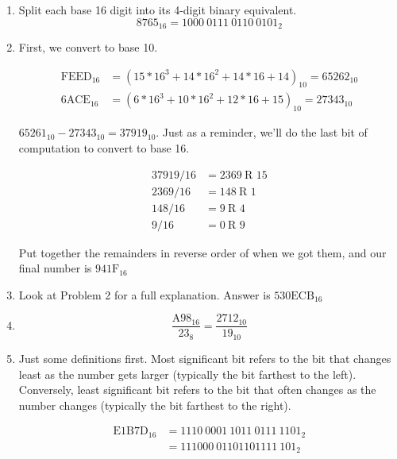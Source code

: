 \documentclass[12pt]{article}
\begin{document}
\begin{enumerate}

\item
Split each base 16 digit into its 4-digit binary equivalent.
\begin{equation*}
8765_{16} = \boxed{1000~0111~0110~0101_{2}}
\end{equation*}

\item
First, we convert to base 10.

\begin{align*}
\text{FEED}_{16} & = (15 * 16^3 + 14 * 16^2 + 14 * 16 + 14)_{10} = 65262_{10}\\
\text{6ACE}_{16} & = (6 * 16^3 + 10 * 16^2 + 12 * 16 + 15)_{10} = 27343_{10}
\end{align*}

$65261_{10} - 27343_{10} = 37919_{10}$.
Just as a reminder, we'll do the last bit of computation to convert to base 16. 

\begin{align*}
37919/16 &= 2369~\text{R 15}\\
2369/16 &= 148~\text{R 1}\\
148/16 &= 9~\text{R 4}\\
9/16 &= 0~\text{R 9}
\end{align*}

Put together the remainders in reverse order of when we got them, and our final number is $\boxed{\text{941F}_{16}}$

\item
Look at Problem 2 for a full explanation. Answer is $\boxed{\text{530ECB}_{16}}$

\item
\begin{equation*}
\frac{\text{A98}_{16}}{23_{8}} =  \boxed{\frac{\text{2712}_{10}}{19_{10}}}
\end{equation*}

\item
Just some definitions first. 
Most significant bit refers to the bit that changes least as the number gets larger 
(typically the bit farthest to the left). 
Conversely, least significant bit refers to the bit that often changes as the number changes
(typically the bit farthest to the right).

\begin{align*}
\text{E1B7D}_{16} &= 1110~0001~1011~0111~1101_2\\
&= 111000~01101101111~101_2
\end{align*}


\end{enumerate}
\end{document}
